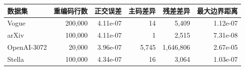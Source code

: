 \begin{tabular}{@{}lrrrrr@{}}
\toprule
数据集 & 重编码行数 & 正交误差 & 主码差异 & 残差差异 & 最大边界距离 \\
\midrule
Vogue & 200,000 & 4.11e-07 & 14 & 5,409 & 1.12e-07 \\
arXiv & 100,000 & 4.11e-07 & 1 & 2,515 & 7.31e-08 \\
OpenAI-3072 & 20,000 & 3.96e-07 & 5,745 & 1,646,806 & 2.67e-05 \\
Stella & 100,000 & 4.34e-07 & 16 & 3,064 & 1.03e-07 \\
\bottomrule
\end{tabular}
